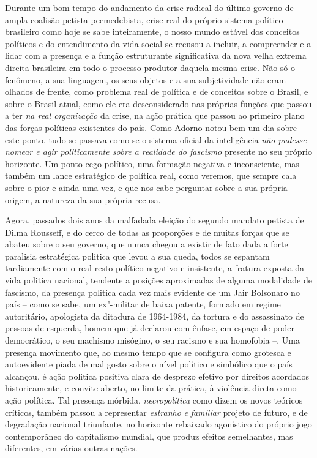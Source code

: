 Durante um bom tempo do andamento da crise radical do último governo de
ampla coalisão petista peemedebista, crise real do próprio sistema
político brasileiro como hoje se sabe inteiramente, o nosso mundo
estável dos conceitos políticos e do entendimento da vida social se
recusou a incluir, a compreender e a lidar com a presença e a função
estruturante significativa da nova velha extrema direita brasileira em
todo o processo produtor daquela mesma crise. Não só o fenômeno, a sua
linguagem, os seus objetos e a sua subjetividade não eram olhados de
frente, como problema real de política e de conceitos sobre o Brasil, e
sobre o Brasil atual, como ele era desconsiderado nas próprias funções
que passou a ter \emph{na real organização} da crise, na ação prática
que passou ao primeiro plano das forças políticas existentes do país.
Como Adorno notou bem um dia sobre este ponto, tudo se passava como se o
sistema oficial da inteligência \emph{não pudesse nomear e agir
politicamente sobre a realidade do fascismo} presente no seu próprio
horizonte. Um ponto cego político, uma formação negativa e inconsciente,
mas também um lance estratégico de política real, como veremos, que
sempre cala sobre o pior e ainda uma vez, e que nos cabe perguntar sobre
a sua própria origem, a natureza da sua própria recusa.

Agora, passados dois anos da malfadada eleição do segundo mandato
petista de Dilma Rousseff, e do cerco de todas as proporções e de muitas
forças que se abateu sobre o seu governo, que nunca chegou a existir de
fato dada a forte paralisia estratégica politica que levou a sua queda,
todos se espantam tardiamente com o real resto político negativo e
insistente, a fratura exposta da vida politica nacional, tendente a
posições aproximadas de alguma modalidade de fascismo, da presença
politica cada vez mais evidente de um Jair Bolsonaro no país -- como se
sabe, um ex"-militar de baixa patente, formado em regime autoritário,
apologista da ditadura de 1964-1984, da tortura e do assassinato de
pessoas de esquerda, homem que já declarou com ênfase, em espaço de
poder democrático, o seu machismo misógino, o seu racismo e sua
homofobia --. Uma presença movimento que, ao mesmo tempo que se
configura como grotesca e autoevidente piada de mal gosto sobre o nível
político e simbólico que o país alcançou, é ação politica positiva clara
de desprezo efetivo por direitos acordados historicamente, e convite
aberto, no limite da prática, à violência direta como ação política. Tal
presença mórbida, \emph{necropolítica} como dizem os novos teóricos
críticos, também passou a representar \emph{estranho} \emph{e}
\emph{familiar} projeto de futuro, e de degradação nacional triunfante,
no horizonte rebaixado agonístico do próprio jogo contemporâneo do
capitalismo mundial, que produz efeitos semelhantes, mas diferentes, em
várias outras nações.

